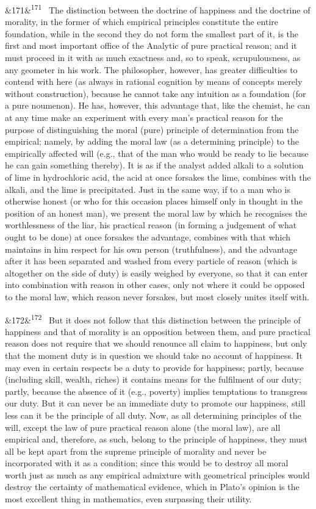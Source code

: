\documentclass[12pt]{article}
\newcommand{\para}[1][]{\par\noindent\ifx&#1&\else\textsuperscript{\footnotesize #1}~\fi}
\begin{document}
\para[171] The distinction between the doctrine of happiness and the doctrine of morality, in the former of which empirical principles constitute the entire foundation, while in the second they do not form the smallest part of it, is the first and most important office of the Analytic of pure practical reason; and it must proceed in it with as much exactness and, so to speak, scrupulousness, as any geometer in his work. The philosopher, however, has greater difficulties to contend with here (as always in rational cognition by means of concepts merely without construction), because he cannot take any intuition as a foundation (for a pure noumenon). He has, however, this advantage that, like the chemist, he can at any time make an experiment with every man's practical reason for the purpose of distinguishing the moral (pure) principle of determination from the empirical; namely, by adding the moral law (as a determining principle) to the empirically affected will (e.g., that of the man who would be ready to lie because he can gain something thereby). It is as if the analyst added alkali to a solution of lime in hydrochloric acid, the acid at once forsakes the lime, combines with the alkali, and the lime is precipitated. Just in the same way, if to a man who is otherwise honest (or who for this occasion places himself only in thought in the position of an honest man), we present the moral law by which he recognises the worthlessness of the liar, his practical reason (in forming a judgement of what ought to be done) at once forsakes the advantage, combines with that which maintains in him respect for his own person (truthfulness), and the advantage after it has been separated and washed from every particle of reason (which is altogether on the side of duty) is easily weighed by everyone, so that it can enter into combination with reason in other cases, only not where it could be opposed to the moral law, which reason never forsakes, but most closely unites itself with.

\para[172] But it does not follow that this distinction between the principle of happiness and that of morality is an opposition between them, and pure practical reason does not require that we should renounce all claim to happiness, but only that the moment duty is in question we should take no account of happiness. It may even in certain respects be a duty to provide for happiness; partly, because (including skill, wealth, riches) it contains means for the fulfilment of our duty; partly, because the absence of it (e.g., poverty) implies temptations to transgress our duty. But it can never be an immediate duty to promote our happiness, still less can it be the principle of all duty. Now, as all determining principles of the will, except the law of pure practical reason alone (the moral law), are all empirical and, therefore, as such, belong to the principle of happiness, they must all be kept apart from the supreme principle of morality and never be incorporated with it as a condition; since this would be to destroy all moral worth just as much as any empirical admixture with geometrical principles would destroy the certainty of mathematical evidence, which in Plato's opinion is the most excellent thing in mathematics, even surpassing their utility.
\end{document}
